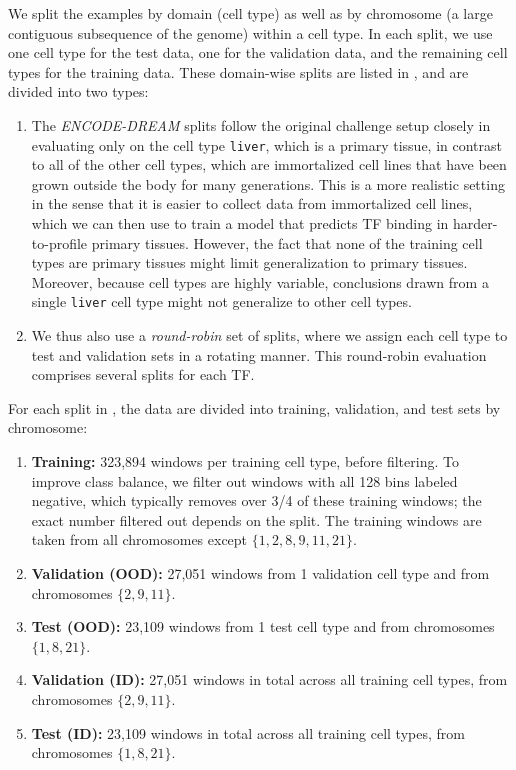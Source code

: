 We split the examples by domain (cell type) as well as by chromosome (a large contiguous subsequence of the genome) within a cell type.
In each split, we use one cell type for the test data, one for the validation data, and the remaining cell types for the training data.
These domain-wise splits are listed in , and are divided into two types:
\begin{enumerate}
  \item The \emph{ENCODE-DREAM} splits follow the original challenge setup \citep{EDsynapse} closely in evaluating only on the cell type \texttt{liver}, which is a primary tissue, in contrast to all of the other cell types, which are immortalized cell lines that have been grown outside the body for many generations. This is a more realistic setting in the sense that it is easier to collect data from immortalized cell lines, which we can then use to train a model that predicts TF binding in harder-to-profile primary tissues.
  However, the fact that none of the training cell types are primary tissues might limit generalization to primary tissues. Moreover, because cell types are highly variable, conclusions drawn from a single \texttt{liver} cell type might not generalize to other cell types.
  \item We thus also use a \emph{round-robin} set of splits, where we assign each cell type to test and validation sets in a rotating manner. This round-robin evaluation comprises several splits for each TF.
\end{enumerate}

For each split in , the data are divided into training, validation, and test sets by chromosome:
\begin{enumerate}
    \item
    \textbf{Training: }
    323,894 windows per training cell type, before filtering.  To improve class balance, we filter out windows with all 128 bins labeled negative, which typically removes over 3/4 of these training windows; the exact number filtered out depends on the split.
    The training windows are taken from all chromosomes except $\{ 1, 2, 8, 9, 11, 21 \}$.
    \item
    \textbf{Validation (OOD): }
    27,051 windows from 1 validation cell type and from chromosomes $\{ 2, 9, 11 \}$.
    \item
    \textbf{Test (OOD): }
    23,109 windows from 1 test cell type and from chromosomes $\{ 1, 8, 21 \}$.
    \item
    \textbf{Validation (ID): }
    27,051 windows in total across all training cell types, from chromosomes $\{ 2, 9, 11 \}$.
    \item
    \textbf{Test (ID): }
    23,109 windows in total across all training cell types, from chromosomes $\{ 1, 8, 21 \}$.
\end{enumerate}

